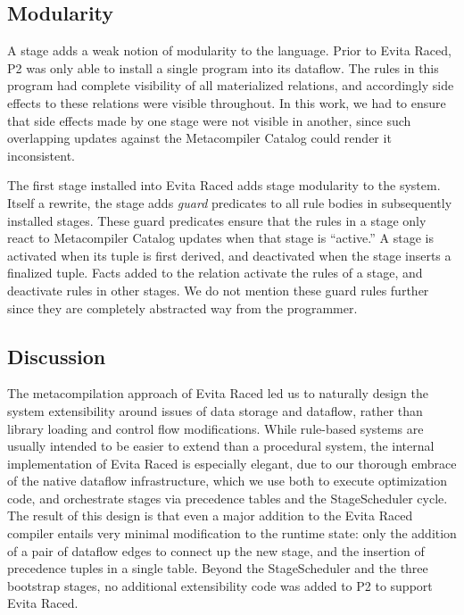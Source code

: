 % 



\subsection{Modularity}
\label{ch:evita:sec:modularity}

A stage adds a weak notion of modularity to the \OVERLOG language.  Prior to
Evita Raced, P2 was only able to install a single \OVERLOG program into its
dataflow.  The rules in this program had complete visibility of all
materialized relations, and accordingly side effects to these relations were
visible throughout.  In this work, we had to ensure that side effects made by
one stage were not visible in another, since such overlapping updates against
the Metacompiler Catalog could render it inconsistent.

The first \OVERLOG stage installed into Evita Raced adds stage modularity to
the system.  Itself a rewrite, the stage adds {\em guard} predicates to all
rule bodies in subsequently installed \OVERLOG stages.  These guard predicates
ensure that the rules in a stage only react to Metacompiler Catalog updates
when that stage is ``active.'' A stage is activated when its
 tuple is first derived, and deactivated when the
stage inserts a finalized  tuple.  Facts added to the 
relation activate the rules of a stage, and deactivate rules in other stages.
We do not mention these guard rules further since they are completely
abstracted way from the programmer.

\subsection{Discussion}

The metacompilation approach of Evita Raced led us to naturally design the
system extensibility around issues of data storage and dataflow, rather than
library loading and control flow modifications.  While rule-based systems are
usually intended to be easier to extend than a procedural system, the internal
implementation of Evita Raced is especially elegant, due to our thorough
embrace of the native dataflow infrastructure, which we use both to execute
optimization code, and orchestrate stages via precedence tables and the
StageScheduler cycle.  The result of this design is that even a major addition
to the Evita Raced compiler entails very minimal modification to the runtime
state: only the addition of a pair of dataflow edges to connect up the new
stage, and the insertion of precedence tuples in a single table.  Beyond the
StageScheduler and the three bootstrap stages, no additional extensibility code
was added to P2 to support Evita Raced.

